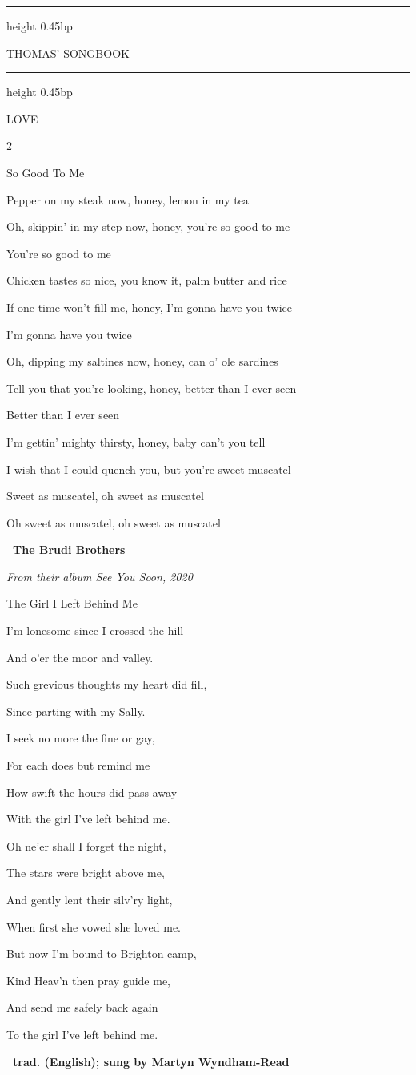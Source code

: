 \documentclass[10pt,twoside]{article}
\newlength{\songcolumnwidth}
\newcommand{\songbooktitle}{Thomas' Songbook}
\newcommand{\categorylabel}[1]{%
  {\categoryface\fontsize{17bp}{19bp}\selectfont\MakeUppercase{#1}}%
}
\newcommand{\category}[1]{%
  \par\noindent
  \parbox[c]{\songcolumnwidth}{%
    \centering
    \hrule height 0.45bp\vskip 2.5bp
    {\mastheadface\fontsize{10bp}{11bp}\selectfont\MakeUppercase{\songbooktitle}\par}%
    \vskip 2bp\hrule height 0.45bp
  }%
  \hfill
  \categorylabel{#1}%
  \par\vspace{11bp}%
}
\newcommand{\songtext}{\raggedright\fontsize{9bp}{9.15bp}\selectfont}
\newenvironment{songcolumns}
  {\begin{multicols*}{2}\songtext}
  {\end{multicols*}}
\newcommand{\songtitle}[1]{%
  \par\addvspace{9bp}%
  {\titleface\fontsize{14.5bp}{15bp}\selectfont #1\par}%
  \nobreak\vskip 2bp%
}
\newcommand{\lyric}[1]{%
  \hangindent=9bp\relax
  #1\par
}
\newenvironment{stanza}{\par\begingroup}{\par\endgroup\addvspace{4bp}}
\newcommand{\chords}[1]{%
  \par\nobreak\vskip 2bp
  {\chordface\fontsize{10bp}{11bp}\selectfont\formatchords{#1}\par}%
  \addvspace{4bp}%
}
\newcommand{\linechords}[1]{%
  \par\nobreak\vskip 2bp
  {\chordface\fontsize{9bp}{10bp}\selectfont\formatchords{#1}\par}%
  \addvspace{4bp}%
}
\newcommand{\songcredit}[1]{%
  \par\nobreak\noindent\hspace*{9bp}%
  {\sffamily\bfseries\fontsize{7bp}{8bp}\selectfont\textemdash\ #1\par}%
}
\newcommand{\sourcedetail}[1]{%
  \nobreak\vskip 1bp
  {\sffamily\itshape\fontsize{6.5bp}{7bp}\selectfont #1\par}%
}
\begin{document}
\category{Love}

\begin{songcolumns}

\songtitle{So Good To Me}
\begin{stanza}
  \lyric{Pepper on my steak now, honey, lemon in my tea}
  \lyric{Oh, skippin' in my step now, honey, you're so good to me}
  \lyric{You're so good to me}
  \chords{C - Am - C - Am - / /\\
          C - - - /}
\end{stanza}
\begin{stanza}
  \lyric{Chicken tastes so nice, you know it, palm butter and rice}
  \lyric{If one time won't fill me, honey, I'm gonna have you twice}
  \lyric{I'm gonna have you twice}
\end{stanza}
\begin{stanza}
  \lyric{Oh, dipping my saltines now, honey, can o' ole sardines}
  \lyric{Tell you that you're looking, honey, better than I ever seen}
  \lyric{Better than I ever seen}
\end{stanza}
\begin{stanza}
  \lyric{I'm gettin' mighty thirsty, honey, baby can't you tell}
  \lyric{I wish that I could quench you, but you're sweet muscatel}
  \lyric{Sweet as muscatel, oh sweet as muscatel}
  \lyric{Oh sweet as muscatel, oh sweet as muscatel}
\end{stanza}
\songcredit{The Brudi Brothers}
\sourcedetail{From their album \emph{See You Soon}, 2020}

\songtitle{The Girl I Left Behind Me}
\begin{stanza}
  \lyric{I'm lonesome since I crossed the hill}
  \lyric{And o'er the moor and valley.}
  \lyric{Such grevious thoughts my heart did fill,}
  \lyric{Since parting with my Sally.}
  \linechords{\mbox{C - G F /} \mbox{C - - - /} \mbox{C - G F /} \mbox{G - C -}}
\end{stanza}
\begin{stanza}
  \lyric{I seek no more the fine or gay,}
  \lyric{For each does but remind me}
  \lyric{How swift the hours did pass away}
  \lyric{With the girl I've left behind me.}
  \linechords{\mbox{C - Am - /} \mbox{C C Am G /} \mbox{C - G F /} \mbox{G - C -}}
\end{stanza}
\begin{stanza}
  \lyric{Oh ne'er shall I forget the night,}
  \lyric{The stars were bright above me,}
  \lyric{And gently lent their silv'ry light,}
  \lyric{When first she vowed she loved me.}
\end{stanza}
\begin{stanza}
  \lyric{But now I'm bound to Brighton camp,}
  \lyric{Kind Heav'n then pray guide me,}
  \lyric{And send me safely back again}
  \lyric{To the girl I've left behind me.}
\end{stanza}
\songcredit{trad. (English); sung by Martyn Wyndham-Read}


\end{songcolumns}
\end{document}
